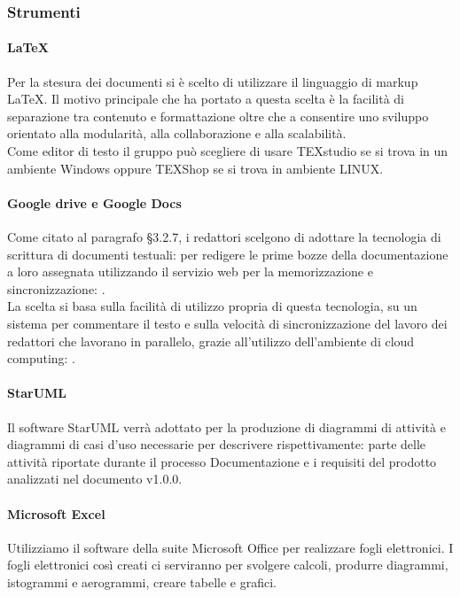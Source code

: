         \subsubsection{Strumenti}
            \paragraph{LaTeX}
                Per la stesura dei documenti si è scelto di utilizzare il linguaggio di markup LaTeX. Il motivo principale che ha portato a questa scelta è la facilità di separazione tra contenuto e formattazione oltre che a consentire uno sviluppo orientato alla modularità, alla collaborazione e alla scalabilità.\\
                Come editor di testo il gruppo può scegliere di usare TEXstudio se si trova in un ambiente Windows oppure TEXShop se si trova in ambiente LINUX.  \\
            \paragraph{Google drive e Google Docs}
                Come citato al paragrafo §3.2.7, i redattori scelgono di adottare la tecnologia di scrittura di documenti testuali:  per redigere le prime bozze della documentazione a loro assegnata utilizzando il servizio web per la memorizzazione e sincronizzazione: . \\
                La scelta si basa sulla facilità di utilizzo propria di questa tecnologia, su un sistema  per commentare il testo e sulla velocità di sincronizzazione del lavoro dei redattori che lavorano in parallelo, grazie all’utilizzo dell’ambiente di cloud computing: . \\
            \paragraph{StarUML}
                Il software StarUML verrà adottato per la produzione di diagrammi di attività e diagrammi di casi d’uso necessarie per descrivere rispettivamente: parte delle attività riportate durante il processo Documentazione e i requisiti del prodotto analizzati nel documento  v1.0.0.
            \paragraph{Microsoft Excel}
                Utilizziamo il software della suite Microsoft Office per realizzare fogli elettronici. I fogli elettronici così creati ci serviranno per svolgere calcoli, produrre diagrammi, istogrammi e aerogrammi, creare tabelle e grafici.
